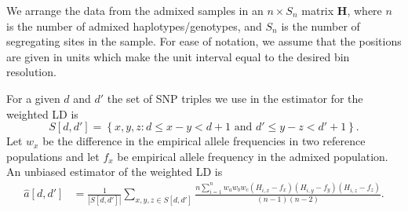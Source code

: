 We arrange the data from the admixed samples in an $n\times S_n $ matrix $\mathbf{H}$, where $n$ is the number of admixed haplotypes/genotypes, and $S_n$ is the number of segregating sites in the sample. For ease of notation, we assume that the positions are given in units which make the unit interval equal to the desired bin resolution.

For a given $d$ and $d'$ the set of SNP triples we use in the estimator for the weighted LD is 
$$
	S[d,d'] = \left\{x,y,z: d\leq  x-y < d+1 \text{ and } d' \leq y-z < d'+1 \right\}.
$$
Let $w_x$ be the difference in the empirical allele frequencies in two reference populations and let $f_x$ be empirical allele frequency in the admixed population. An unbiased estimator of the weighted LD is
\begin{align*}
	\hat{a}[d,d']&=
		\frac{1}{|S[d,d']|}
		\sum_{x,y,z\in S[d,d']}\frac{n\sum_{i=1}^n
			w_a w_b w_c(H_{i,x}-f_x)(H_{i,y}-f_y)(H_{i,z}-f_z)}{(n-1)(n-2)}.
\end{align*}

